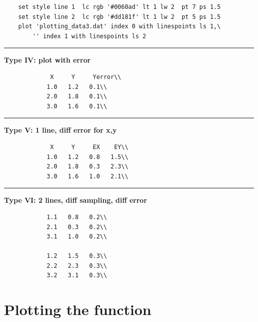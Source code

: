 \documentclass{beamer}
\begin{document}
\begin{frame}
\begin{Verbatim}
	set style line 1  lc rgb '#0060ad' lt 1 lw 2  pt 7 ps 1.5
	set style line 2  lc rgb '#dd181f' lt 1 lw 2  pt 5 ps 1.5
	plot 'plotting_data3.dat' index 0 with linespoints ls 1,\
		'' index 1 with linespoints ls 2
		\end{Verbatim}
		\vspace{.3cm}
		\hrule 
		\vspace{.3cm}
		\textbf{Type IV: plot with error}
		\begin{Verbatim}
			 X     Y     Yerror\\
			1.0   1.2   0.1\\
			2.0   1.8   0.1\\
			3.0   1.6   0.1\\
		\end{Verbatim}
		\vspace{.3cm}
		\hrule 
		\vspace{.3cm}
			\textbf{Type V: 1 line, diff error for x,y}\\
		\begin{verbatim}
			 X     Y     EX    EY\\
			1.0   1.2   0.8   1.5\\
			2.0   1.8   0.3   2.3\\
			3.0   1.6   1.0   2.1\\				
		\end{verbatim}
		\vspace{.3cm}
		\hrule 
		\vspace{.3cm}
		\textbf{Type VI: 2 lines, diff sampling, diff error}\\
		\begin{verbatim}
			1.1   0.8   0.2\\
			2.1   0.3   0.2\\
			3.1   1.0   0.2\\
							
			1.2   1.5   0.3\\
			2.2   2.3   0.3\\
			3.2   3.1   0.3\\
		\end{verbatim}
	\end{frame}




	\section{Plotting the function}


	
\end{document}
